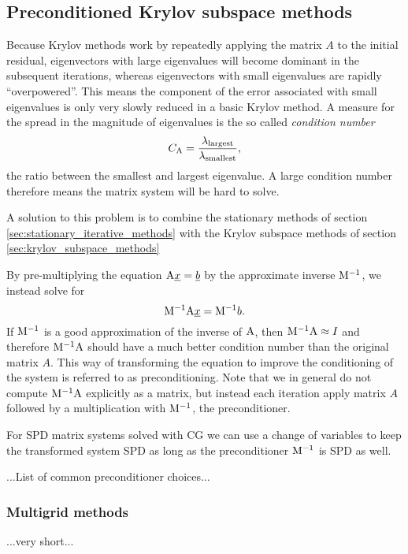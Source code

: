 \subsection{Preconditioned Krylov subspace methods} \label{ND_Preconditioners}
Because Krylov methods work by repeatedly applying the matrix 
$A$ to the initial residual, eigenvectors with large 
eigenvalues will become dominant in the subsequent iterations, whereas 
eigenvectors with small eigenvalues are rapidly ``overpowered''. This 
means the component of the error associated with small eigenvalues 
is only very slowly reduced in a basic Krylov method. A measure for the
spread in the magnitude of eigenvalues is the so called 
\emph{condition number}
\begin{equation*}
  C_{\mathrm{A}}=\frac{ \lambda_{\text{largest}} }
    { \lambda_{\text{smallest}} },
\end{equation*}
the ratio between the smallest and largest eigenvalue. A large 
condition number therefore means the matrix system will be hard to solve.

A solution to this problem is to combine the stationary methods of 
section \ref{sec:stationary_iterative_methods} with the 
Krylov subspace methods of section \ref{sec:krylov_subspace_methods}

By pre-multiplying the equation
$\mathrm{A}\underline{x}=\underline{b}$ by the approximate inverse 
$\mathrm{M}^{-1}$, we instead solve for
\begin{equation*}
  \mathrm{M}^{-1}\mathrm{A}\underline{x} = \mathrm{M}^{-1}b.
\end{equation*}
If $\mathrm{M}^{-1}$ is a good approximation of the inverse of $\mathrm{A}$, 
then
$\mathrm{M}^{-1}\mathrm{A}\approx I$ and therefore $\mathrm{M}^{-1}\mathrm{A}$
should have a much better condition number than the 
original matrix $A$. This way of transforming the equation to improve
the conditioning of the system is referred to as preconditioning. Note
that we in general do not compute $\mathrm{M}^{-1}\mathrm{A}$ explicitly
as a matrix, but instead each iteration 
apply matrix $A$ followed by a multiplication 
with $\mathrm{M}^{-1}$, the preconditioner.

For SPD matrix systems solved with CG we can use a change 
of variables to keep the transformed system SPD as long as the 
preconditioner $\mathrm{M}^{-1}$ is SPD as well.

...List of common preconditioner choices...

\subsubsection{Multigrid methods}
...very short...

